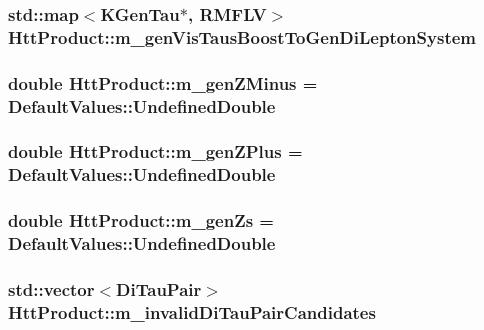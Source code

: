 \hypertarget{classHttProduct_ad51c5ccec06913d5eb09f11bc42bbce5}{
\subsubsection[{m\_\-genVisTausBoostToGenDiLeptonSystem}]{\setlength{\rightskip}{0pt plus 5cm}std::map$<$KGenTau$\ast$, RMFLV$>$ {\bf HttProduct::m\_\-genVisTausBoostToGenDiLeptonSystem}}}
\label{classHttProduct_ad51c5ccec06913d5eb09f11bc42bbce5}
\hypertarget{classHttProduct_a7da22d22be0ba3757a18a750846dd7f2}{
\subsubsection[{m\_\-genZMinus}]{\setlength{\rightskip}{0pt plus 5cm}double {\bf HttProduct::m\_\-genZMinus} = DefaultValues::UndefinedDouble}}
\label{classHttProduct_a7da22d22be0ba3757a18a750846dd7f2}
\hypertarget{classHttProduct_afe89f44a7b3f1740434a14a97f6ca420}{
\subsubsection[{m\_\-genZPlus}]{\setlength{\rightskip}{0pt plus 5cm}double {\bf HttProduct::m\_\-genZPlus} = DefaultValues::UndefinedDouble}}
\label{classHttProduct_afe89f44a7b3f1740434a14a97f6ca420}
\hypertarget{classHttProduct_a5faddab4b5f97fa2d558d451f6fa2ea7}{
\subsubsection[{m\_\-genZs}]{\setlength{\rightskip}{0pt plus 5cm}double {\bf HttProduct::m\_\-genZs} = DefaultValues::UndefinedDouble}}
\label{classHttProduct_a5faddab4b5f97fa2d558d451f6fa2ea7}
\hypertarget{classHttProduct_ab3c39138bbc65d2e38906de8726f21b4}{
\subsubsection[{m\_\-invalidDiTauPairCandidates}]{\setlength{\rightskip}{0pt plus 5cm}std::vector$<${\bf DiTauPair}$>$ {\bf HttProduct::m\_\-invalidDiTauPairCandidates}}}
